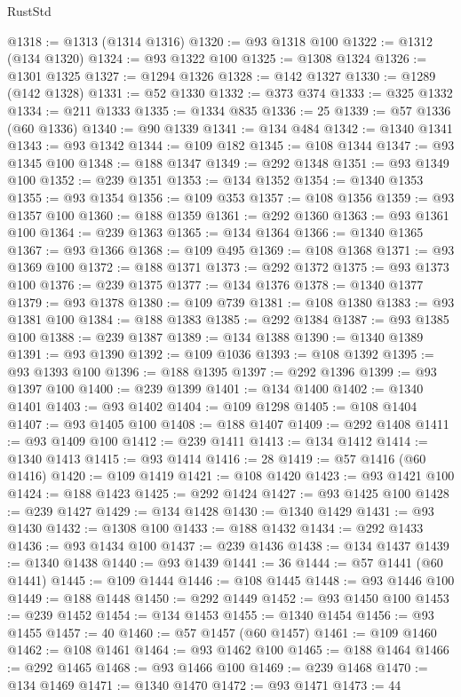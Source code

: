 \begin{lexlean}{RustStd}
\begin{coremodule}
@1318 := @1313 (@1314 @1316)
@1320 := @93 @1318 @100
@1322 := @1312 (@134 @1320)
@1324 := @93 @1322 @100
@1325 := @1308 @1324
@1326 := @1301 @1325
@1327 := @1294 @1326
@1328 := @142 @1327
@1330 := @1289 (@142 @1328)
@1331 := @52 @1330
@1332 := @373 @374
@1333 := @325 @1332
@1334 := @211 @1333
@1335 := @1334 @835
@1336 := 25
@1339 := @57 @1336 (@60 @1336)
@1340 := @90 @1339
@1341 := @134 @484
@1342 := @1340 @1341
@1343 := @93 @1342
@1344 := @109 @182
@1345 := @108 @1344
@1347 := @93 @1345 @100
@1348 := @188 @1347
@1349 := @292 @1348
@1351 := @93 @1349 @100
@1352 := @239 @1351
@1353 := @134 @1352
@1354 := @1340 @1353
@1355 := @93 @1354
@1356 := @109 @353
@1357 := @108 @1356
@1359 := @93 @1357 @100
@1360 := @188 @1359
@1361 := @292 @1360
@1363 := @93 @1361 @100
@1364 := @239 @1363
@1365 := @134 @1364
@1366 := @1340 @1365
@1367 := @93 @1366
@1368 := @109 @495
@1369 := @108 @1368
@1371 := @93 @1369 @100
@1372 := @188 @1371
@1373 := @292 @1372
@1375 := @93 @1373 @100
@1376 := @239 @1375
@1377 := @134 @1376
@1378 := @1340 @1377
@1379 := @93 @1378
@1380 := @109 @739
@1381 := @108 @1380
@1383 := @93 @1381 @100
@1384 := @188 @1383
@1385 := @292 @1384
@1387 := @93 @1385 @100
@1388 := @239 @1387
@1389 := @134 @1388
@1390 := @1340 @1389
@1391 := @93 @1390
@1392 := @109 @1036
@1393 := @108 @1392
@1395 := @93 @1393 @100
@1396 := @188 @1395
@1397 := @292 @1396
@1399 := @93 @1397 @100
@1400 := @239 @1399
@1401 := @134 @1400
@1402 := @1340 @1401
@1403 := @93 @1402
@1404 := @109 @1298
@1405 := @108 @1404
@1407 := @93 @1405 @100
@1408 := @188 @1407
@1409 := @292 @1408
@1411 := @93 @1409 @100
@1412 := @239 @1411
@1413 := @134 @1412
@1414 := @1340 @1413
@1415 := @93 @1414
@1416 := 28
@1419 := @57 @1416 (@60 @1416)
@1420 := @109 @1419
@1421 := @108 @1420
@1423 := @93 @1421 @100
@1424 := @188 @1423
@1425 := @292 @1424
@1427 := @93 @1425 @100
@1428 := @239 @1427
@1429 := @134 @1428
@1430 := @1340 @1429
@1431 := @93 @1430
@1432 := @1308 @100
@1433 := @188 @1432
@1434 := @292 @1433
@1436 := @93 @1434 @100
@1437 := @239 @1436
@1438 := @134 @1437
@1439 := @1340 @1438
@1440 := @93 @1439
@1441 := 36
@1444 := @57 @1441 (@60 @1441)
@1445 := @109 @1444
@1446 := @108 @1445
@1448 := @93 @1446 @100
@1449 := @188 @1448
@1450 := @292 @1449
@1452 := @93 @1450 @100
@1453 := @239 @1452
@1454 := @134 @1453
@1455 := @1340 @1454
@1456 := @93 @1455
@1457 := 40
@1460 := @57 @1457 (@60 @1457)
@1461 := @109 @1460
@1462 := @108 @1461
@1464 := @93 @1462 @100
@1465 := @188 @1464
@1466 := @292 @1465
@1468 := @93 @1466 @100
@1469 := @239 @1468
@1470 := @134 @1469
@1471 := @1340 @1470
@1472 := @93 @1471
@1473 := 44

\end{coremodule}
\end{lexlean}
